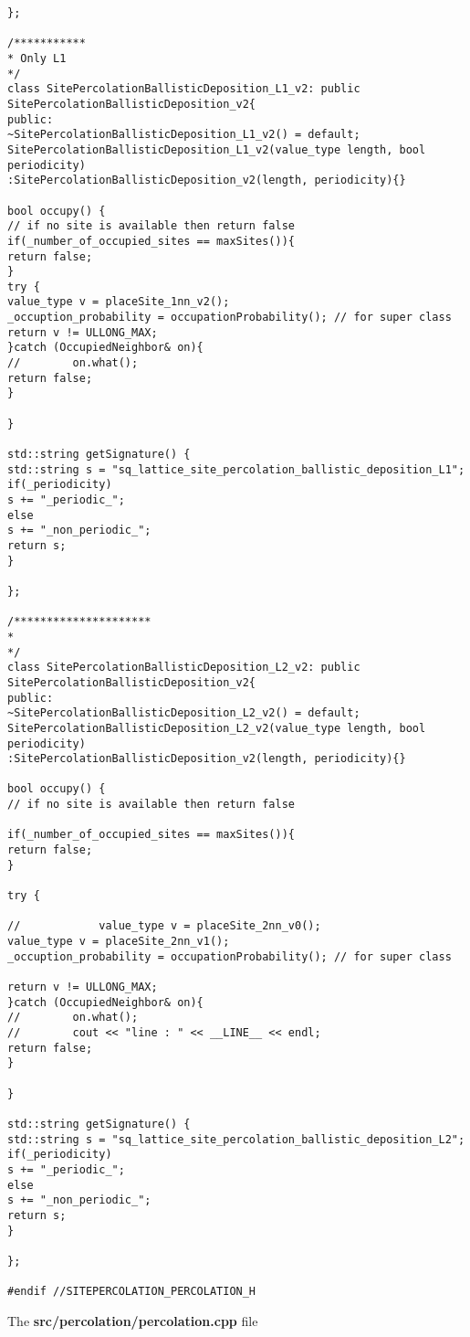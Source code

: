 \begin{lstlisting}[style=CStyle]
};

/***********
* Only L1
*/
class SitePercolationBallisticDeposition_L1_v2: public SitePercolationBallisticDeposition_v2{
public:
~SitePercolationBallisticDeposition_L1_v2() = default;
SitePercolationBallisticDeposition_L1_v2(value_type length, bool periodicity)
:SitePercolationBallisticDeposition_v2(length, periodicity){}

bool occupy() {
// if no site is available then return false
if(_number_of_occupied_sites == maxSites()){
return false;
}
try {
value_type v = placeSite_1nn_v2();
_occuption_probability = occupationProbability(); // for super class
return v != ULLONG_MAX;
}catch (OccupiedNeighbor& on){
//        on.what();
return false;
}

}

std::string getSignature() {
std::string s = "sq_lattice_site_percolation_ballistic_deposition_L1";
if(_periodicity)
s += "_periodic_";
else
s += "_non_periodic_";
return s;
}

};

/*********************
*
*/
class SitePercolationBallisticDeposition_L2_v2: public SitePercolationBallisticDeposition_v2{
public:
~SitePercolationBallisticDeposition_L2_v2() = default;
SitePercolationBallisticDeposition_L2_v2(value_type length, bool periodicity)
:SitePercolationBallisticDeposition_v2(length, periodicity){}

bool occupy() {
// if no site is available then return false

if(_number_of_occupied_sites == maxSites()){
return false;
}

try {

//            value_type v = placeSite_2nn_v0();
value_type v = placeSite_2nn_v1();
_occuption_probability = occupationProbability(); // for super class

return v != ULLONG_MAX;
}catch (OccupiedNeighbor& on){
//        on.what();
//        cout << "line : " << __LINE__ << endl;
return false;
}

}

std::string getSignature() {
std::string s = "sq_lattice_site_percolation_ballistic_deposition_L2";
if(_periodicity)
s += "_periodic_";
else
s += "_non_periodic_";
return s;
}

};

#endif //SITEPERCOLATION_PERCOLATION_H

\end{lstlisting}

The \textbf{src/percolation/percolation.cpp} file

